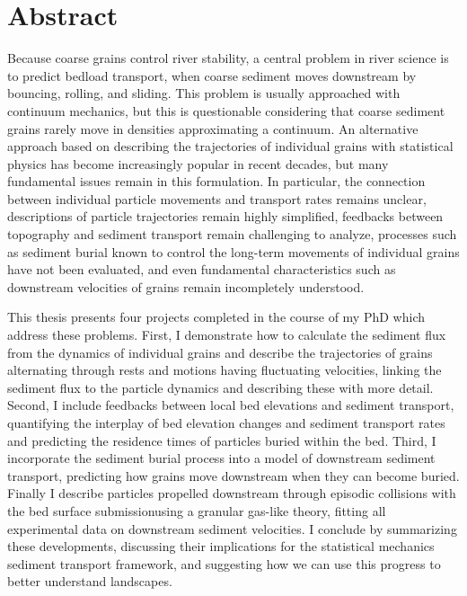 
\chapter{Abstract}


Because coarse grains control river stability, a central problem in river science is to predict bedload transport, when coarse sediment moves downstream by bouncing, rolling, and sliding.
This problem is usually approached with continuum mechanics, but this is questionable considering that coarse sediment grains rarely move in densities approximating a continuum.
An alternative approach based on describing the trajectories of individual grains with statistical physics has become increasingly popular in recent decades, but many fundamental issues remain in this formulation.
In particular, the connection between individual particle movements and transport rates remains unclear, descriptions of particle trajectories remain highly simplified, feedbacks between topography and sediment transport remain challenging to analyze, processes such as sediment burial known to control the long-term movements of individual grains have not been evaluated, and even fundamental characteristics such as downstream velocities of grains remain incompletely understood.

This thesis presents four projects completed in the course of my PhD which address these problems.
First, I demonstrate how to calculate the sediment flux from the dynamics of individual grains and describe the trajectories of grains alternating through rests and motions having fluctuating velocities, linking the sediment flux to the particle dynamics and describing these with more detail.
Second, I include feedbacks between local bed elevations and sediment transport, quantifying the interplay of bed elevation changes and sediment transport rates and predicting the residence times of particles buried within the bed.
Third, I incorporate the sediment burial process into a model of downstream sediment transport, predicting how grains move downstream when they can become buried.
Finally I describe particles propelled downstream through episodic collisions with the bed surface submissionusing a granular gas-like theory, fitting all experimental data on downstream sediment velocities.
I conclude by summarizing these developments, discussing their implications for the statistical mechanics sediment transport framework, and suggesting how we can use this progress to better understand landscapes.


